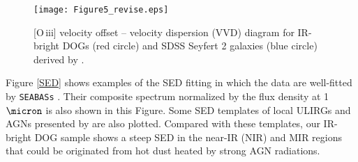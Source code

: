 \documentclass[twocolumn]{aastex6}
\newcommand{\oiii}{[O{\,\sc iii}]\,\,}
\begin{document}
    \begin{figure*}
   \centering
   \texttt{[image: Figure5\_revise.eps]}
   \caption{\oiii velocity offset -- velocity dispersion (VVD) diagram for IR-bright DOGs (red circle) and SDSS Seyfert 2 galaxies (blue circle) derived by \cite{Woo}.}
   \label{VVD}
   \end{figure*}  
   
Figure \ref{SED} shows examples of the SED fitting in which the data are well-fitted by {\tt SEABASs} \citep[see also][]{Toba_16}.
Their composite spectrum normalized by the flux density at 1 $\micron$ is also shown in this Figure.
Some SED templates of local ULIRGs and AGNs presented by \cite{Polletta} are also plotted.
Compared with these templates, our IR-bright DOG sample shows a steep SED in the near-IR (NIR) and MIR regions that could be originated from hot dust heated by strong AGN radiations. 
\end{document}
